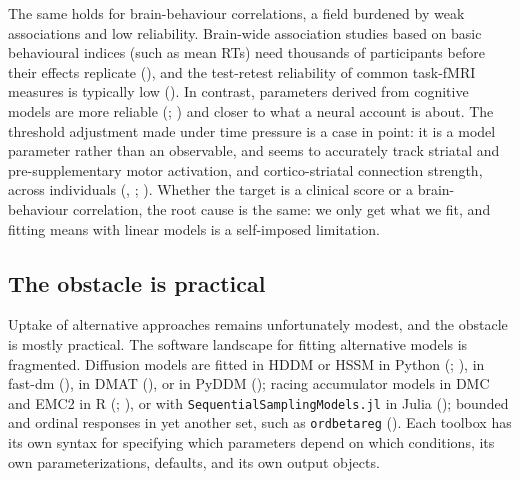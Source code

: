 \documentclass[
  jou,
  floatsintext,
  longtable,
  nolmodern,
  notxfonts,
  notimes,
  12pt,
  colorlinks=true,linkcolor=blue,citecolor=blue,urlcolor=blue]{apa7}
\begin{document}
The same holds for brain-behaviour correlations, a field burdened by
weak associations and low reliability. Brain-wide association studies
based on basic behavioural indices (such as mean RTs) need thousands of
participants before their effects replicate
(), and the
test-retest reliability of common task-fMRI measures is typically low
(). In contrast,
parameters derived from cognitive models are more reliable
(;
) and closer to
what a neural account is about. The threshold adjustment made under time
pressure is a case in point: it is a model parameter rather than an
observable, and seems to accurately track striatal and pre-supplementary
motor activation, and cortico-striatal connection strength, across
individuals (, ;
). Whether the
target is a clinical score or a brain-behaviour correlation, the root
cause is the same: we only get what we fit, and fitting means with
linear models is a self-imposed limitation.

\subsection{The obstacle is practical}\label{the-obstacle-is-practical}

Uptake of alternative approaches remains unfortunately modest, and the
obstacle is mostly practical. The software landscape for fitting
alternative models is fragmented. Diffusion models are fitted in HDDM or
HSSM in Python (;
), in fast-dm
(), in DMAT
(), or in PyDDM (); racing accumulator models in DMC and EMC2 in R
(;
), or with
\texttt{SequentialSamplingModels.jl} in Julia
(); bounded
and ordinal responses in yet another set, such as \texttt{ordbetareg}
(). Each toolbox has
its own syntax for specifying which parameters depend on which
conditions, its own parameterizations, defaults, and its own output
objects.
\end{document}

